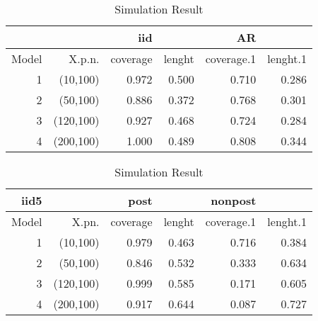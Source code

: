 \documentclass[11pt,oneside, a4paper]{amsart}\usepackage[]{graphicx}\usepackage[]{color}
\makeatletter
\newenvironment{kframe}{%
 \def\at@end@of@kframe{}%
 \ifinner\ifhmode%
  \def\at@end@of@kframe{\end{minipage}}%
  \begin{minipage}{\columnwidth}%
 \fi\fi%
 \def\FrameCommand##1{\hskip\@totalleftmargin \hskip-\fboxsep
 \colorbox{shadecolor}{##1}\hskip-\fboxsep
     \hskip-\linewidth \hskip-\@totalleftmargin \hskip\columnwidth}%
 \MakeFramed {\advance\hsize-\width
   \@totalleftmargin\z@ \linewidth\hsize
   \@setminipage}}%
 {\par\unskip\endMakeFramed%
 \at@end@of@kframe}
\newenvironment{knitrout}{}{} %
\makeatother
\begin{document}
\begin{table}[ht]
\centering
\caption{Simulation Result} 
\label{Test_table}
{\footnotesize
\begin{tabular}{|r|r|rr|rr|}
  \toprule 
    &  & iid &  & AR &  \\
 \midrule 
Model & X.p.n. & coverage & lenght & coverage.1 & lenght.1 \\ 
    1 & (10,100) & 0.972 & 0.500 & 0.710 & 0.286 \\ 
     2 & (50,100) & 0.886 & 0.372 & 0.768 & 0.301 \\ 
     3 & (120,100) & 0.927 & 0.468 & 0.724 & 0.284 \\ 
     4 & (200,100) & 1.000 & 0.489 & 0.808 & 0.344 \\ 
   \bottomrule 
\end{tabular}
}
\end{table}








\begin{table}[ht]
\centering
\caption{Simulation Result} 
\label{Test_table}
{\footnotesize
\begin{tabular}{|r|r|rr|rr|}
  \toprule 
   iid5 &  & post & & nonpost &  \\
 \midrule 
Model & X.pn. & coverage & lenght & coverage.1 & lenght.1 \\ 
    1 & (10,100) & 0.979 & 0.463 & 0.716 & 0.384 \\ 
     2 & (50,100) & 0.846 & 0.532 & 0.333 & 0.634 \\ 
     3 & (120,100) & 0.999 & 0.585 & 0.171 & 0.605 \\ 
     4 & (200,100) & 0.917 & 0.644 & 0.087 & 0.727 \\ 
   \bottomrule 
\end{tabular}
}
\end{table}



\begin{knitrout}
\color{fgcolor}\begin{kframe}


{\ttfamily\noindent\bfseries\color{errorcolor}{\#\# Error in ystar[, i] <- prediction + estar[, i]: l'argument de remplacement est de longueur nulle}}\end{kframe}
\end{knitrout}
\end{document}
